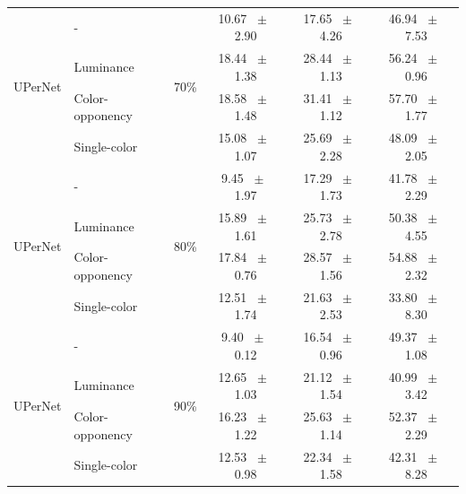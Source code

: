 \begin{table}[h]
\begin{tabular}{@{}l l c c c c@{}}
    \multirow{4}{*}{UPerNet} & - & \multirow{4}{*}{70\%} & 10.67 ~$\pm$~ 2.90 & 17.65 ~$\pm$~ 4.26 & 46.94 ~$\pm$~ 7.53 \\
    & Luminance &  & 18.44 ~$\pm$~ 1.38 & 28.44 ~$\pm$~ 1.13 & 56.24 ~$\pm$~ 0.96 \\
    & Color-opponency &  & 18.58 ~$\pm$~ 1.48 & 31.41 ~$\pm$~ 1.12 & 57.70 ~$\pm$~ 1.77 \\
    & Single-color &  & 15.08 ~$\pm$~ 1.07 & 25.69 ~$\pm$~ 2.28 & 48.09 ~$\pm$~ 2.05 \\
    \midrule
    \multirow{4}{*}{UPerNet} & - & \multirow{4}{*}{80\%} & 9.45 ~$\pm$~ 1.97 & 17.29 ~$\pm$~ 1.73 & 41.78 ~$\pm$~ 2.29 \\
    & Luminance &  & 15.89 ~$\pm$~ 1.61 & 25.73 ~$\pm$~ 2.78 & 50.38 ~$\pm$~ 4.55 \\
    & Color-opponency &  & 17.84 ~$\pm$~ 0.76 & 28.57 ~$\pm$~ 1.56 & 54.88 ~$\pm$~ 2.32 \\
    & Single-color &  & 12.51 ~$\pm$~ 1.74 & 21.63 ~$\pm$~ 2.53 & 33.80 ~$\pm$~ 8.30 \\
    \midrule
    \multirow{4}{*}{UPerNet} & - & \multirow{4}{*}{90\%} & 9.40 ~$\pm$~ 0.12 & 16.54 ~$\pm$~ 0.96 & 49.37 ~$\pm$~ 1.08 \\
    & Luminance &  & 12.65 ~$\pm$~ 1.03 & 21.12 ~$\pm$~ 1.54 & 40.99 ~$\pm$~ 3.42 \\
    & Color-opponency &  & 16.23 ~$\pm$~ 1.22 & 25.63 ~$\pm$~ 1.14 & 52.37 ~$\pm$~ 2.29 \\
    & Single-color &  & 12.53 ~$\pm$~ 0.98 & 22.34 ~$\pm$~ 1.58 & 42.31 ~$\pm$~ 8.28 \\
    \midrule
    \bottomrule
  \end{tabular}
  \label{tab:upernet_acdc_night}
\end{table}